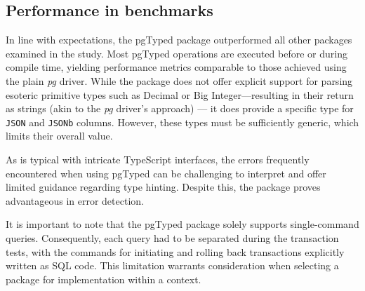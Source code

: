 \subsection*{Performance in benchmarks}
In line with expectations, the pgTyped package outperformed all other packages
examined in the study. Most pgTyped operations are executed before or during
compile time, yielding performance metrics comparable to those achieved using
the plain \textit{pg} driver. While the package does not offer explicit support for
parsing esoteric primitive types such as Decimal or Big Integer—resulting in
their return as strings (akin to the \textit{pg} driver's approach) — it does provide a
specific type for \texttt{JSON} and \texttt{JSONb} columns. However, these types
must be sufficiently generic, which limits their overall value.

As is typical with intricate TypeScript interfaces, the errors frequently
encountered when using pgTyped can be challenging to interpret and offer
limited guidance regarding type hinting. Despite this, the package proves
advantageous in error detection.

It is important to note that the pgTyped package solely supports
single-command queries. Consequently, each query had to be separated during the
transaction tests, with the commands for initiating and rolling back
transactions explicitly written as SQL code. This limitation warrants
consideration when selecting a package for implementation within a context.
